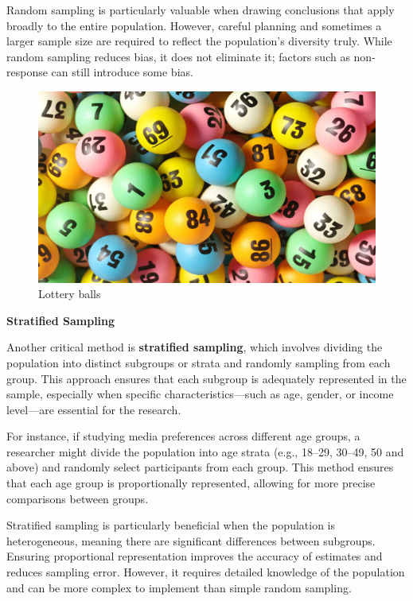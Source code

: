 \documentclass[
]{book}
\begin{document}
Random sampling is particularly valuable when drawing conclusions that apply broadly to the entire population. However, careful planning and sometimes a larger sample size are required to reflect the population's diversity truly. While random sampling reduces bias, it does not eliminate it; factors such as non-response can still introduce some bias.

\begin{figure}
\centering
\includegraphics[width=1\linewidth,height=\textheight,keepaspectratio]{images/random.jpg}
\caption{Lottery balls}
\end{figure}

\textbf{Stratified Sampling}

Another critical method is \textbf{stratified sampling}, which involves dividing the population into distinct subgroups or strata and randomly sampling from each group. This approach ensures that each subgroup is adequately represented in the sample, especially when specific characteristics---such as age, gender, or income level---are essential for the research.

For instance, if studying media preferences across different age groups, a researcher might divide the population into age strata (e.g., 18--29, 30--49, 50 and above) and randomly select participants from each group. This method ensures that each age group is proportionally represented, allowing for more precise comparisons between groups.

Stratified sampling is particularly beneficial when the population is heterogeneous, meaning there are significant differences between subgroups. Ensuring proportional representation improves the accuracy of estimates and reduces sampling error. However, it requires detailed knowledge of the population and can be more complex to implement than simple random sampling.
\end{document}
